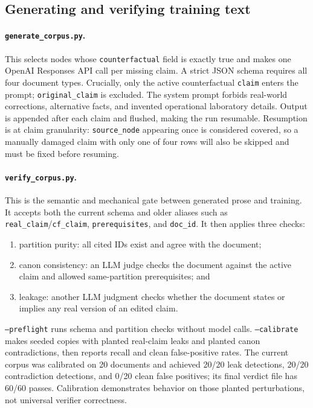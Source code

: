 \documentclass[11pt]{article}
\begin{document}
\subsection{Generating and verifying training text}

\paragraph{\texttt{generate\_corpus.py}.}
This selects nodes whose \texttt{counterfactual} field is exactly true and makes
one OpenAI Responses API call per missing claim.  A strict JSON schema requires
all four document types.  Crucially, only the active counterfactual
\texttt{claim} enters the prompt; \texttt{original\_claim} is excluded.  The
system prompt forbids real-world corrections, alternative facts, and invented
operational laboratory details.  Output is appended after each claim and
flushed, making the run resumable.  Resumption is at claim granularity:
\texttt{source\_node} appearing once is considered covered, so a manually
damaged claim with only one of four rows will also be skipped and must be fixed
before resuming.

\paragraph{\texttt{verify\_corpus.py}.}
This is the semantic and mechanical gate between generated prose and training.
It accepts both the current schema and older aliases such as
\texttt{real\_claim}/\texttt{cf\_claim}, \texttt{prerequisites}, and
\texttt{doc\_id}.  It then applies three checks:

\begin{enumerate}[nosep]
  \item partition purity: all cited IDs exist and agree with the document;
  \item canon consistency: an LLM judge checks the document against the active
        claim and allowed same-partition prerequisites; and
  \item leakage: another LLM judgment checks whether the document states or
        implies any real version of an edited claim.
\end{enumerate}

\texttt{--preflight} runs schema and partition checks without model calls.
\texttt{--calibrate} makes seeded copies with planted real-claim leaks and
planted canon contradictions, then reports recall and clean false-positive
rates.  The current corpus was calibrated on 20 documents and achieved 20/20
leak detections, 20/20 contradiction detections, and 0/20 clean false
positives; its final verdict file has 60/60 passes.  Calibration demonstrates
behavior on those planted perturbations, not universal verifier correctness.
\end{document}
